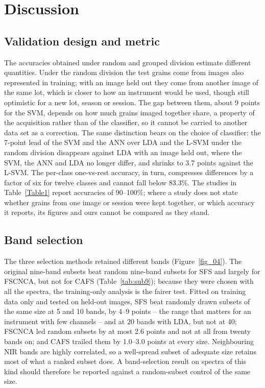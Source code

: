 \documentclass[final,5p,times,twocolumn]{elsarticle}
\newcommand{\added}[1]{{\color{blue}#1}}
\begin{document}
\added{\section{Discussion}\label{sec_discussion}

\subsection{Validation design and metric}
The accuracies obtained under random and grouped division estimate different quantities. Under the random division the test grains come from images also represented in training; with an image held out they come from another image of the same lot, which is closer to how an instrument would be used, though still optimistic for a new lot, season or session. The gap between them, about 9 points for the SVM, depends on how much grains imaged together share, a property of the acquisition rather than of the classifier, so it cannot be carried to another data set as a correction. The same distinction bears on the choice of classifier: the 7-point lead of the SVM and the ANN over LDA and the L-SVM under the random division disappears against LDA with an image held out, where the SVM, the ANN and LDA no longer differ, and shrinks to 3.7 points against the L-SVM. The per-class one-vs-rest accuracy, in turn, compresses differences by a factor of six for twelve classes and cannot fall below 83.3\%. The studies in Table~\ref{Table1} report accuracies of 90--100\%; where a study does not state whether grains from one image or session were kept together, or which accuracy it reports, its figures and ours cannot be compared as they stand.

\subsection{Band selection}
The three selection methods retained different bands (Figure~\ref{fig_04}). The original nine-band subsets beat random nine-band subsets for SFS and largely for FSCNCA, but not for CAFS (Table~\ref{tab:sub9}); because they were chosen with all the spectra, the training-only analysis is the fairer test. Fitted on training data only and tested on held-out images, SFS beat randomly drawn subsets of the same size at 5 and 10 bands, by 4--9 points -- the range that matters for an instrument with few channels -- and at 20 bands with LDA, but not at 40; FSCNCA led random subsets by at most 2.6 points and not at all from twenty bands on; and CAFS trailed them by 1.0--3.0 points at every size. Neighbouring NIR bands are highly correlated, so a well-spread subset of adequate size retains most of what a ranked subset does. A band-selection result on spectra of this kind should therefore be reported against a random-subset control of the same size.

}
\end{document}
